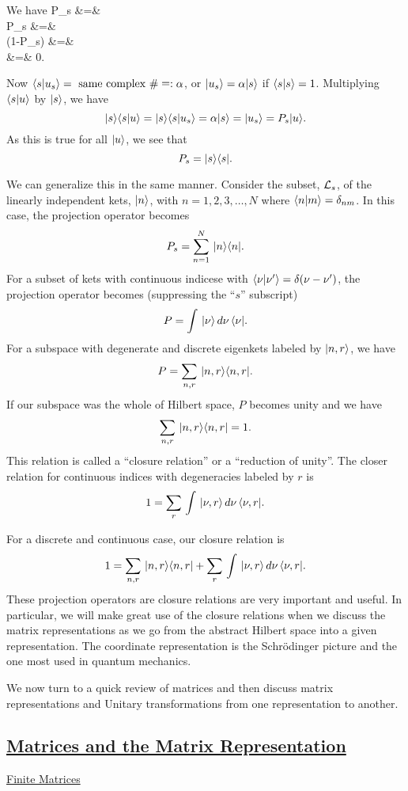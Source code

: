 We have 
\bearray
P_s  &=&  \\
P_s  &=&  \\
(1-P_s)  &=&  \\
  &=& 0.
\eearray

Now $\langle s|u_s\rangle = \mbox{ same complex } \#  \mathrel{\mathop=}: \alpha$, or $|u_s\rangle = \alpha|s\rangle$ if $\langle s|s\rangle = 1$. Multiplying $\langle s|u\rangle$ by $|s\rangle$, we have
$$|s\rangle\langle s|u\rangle = |s\rangle\langle s|u_s\rangle = \alpha |s\rangle = |u_s\rangle = P_s |u\rangle.$$
As this is true for all $|u\rangle$, we see that $$P_s = |s\rangle\langle s|.$$ 

We can generalize this in the same manner. Consider the subset, ${\cal L}_s$, of the linearly independent kets, $|n\rangle$, with $n = 1, 2, 3, \hdots, N$ where $\langle n|m\rangle = \delta_{nm}$. In this case, the projection operator becomes
$$P_s = \sum_{n=1}^N\, |n\rangle\langle n|.$$
For a subset of kets with continuous indicese with $\langle \nu|\nu'\rangle = \delta(\nu - \nu')$, the projection operator becomes (suppressing the ``$s$'' subscript)
$$P = \int\, |\nu\rangle\, d\nu\, \langle \nu|.$$
For a subspace with degenerate and discrete eigenkets labeled by $|n,r\rangle$, we have
$$P = \sum_{n,r}\, |n,r\rangle\langle n,r|.$$ If our subspace was the whole of Hilbert space, $P$ becomes unity and we have
$$\sum_{n,r}\, |n,r\rangle\langle n,r| = 1.$$ This relation is called a ``closure relation'' or a ``reduction of unity''. The closer relation for continuous indices with degeneracies labeled by $r$ is 
$$1 = \sum_r\,\int\, |\nu,r\rangle\, d\nu\, \langle \nu,r|.$$

For a discrete and continuous case, our closure relation is 
$$1 = \sum_{n,r}\, |n,r\rangle\langle n,r| + \sum_r\, \int\, |\nu,r\rangle\, d\nu\, \langle \nu,r|.$$
These projection operators are closure relations are very important and useful. In particular, we will make great use of the closure relations when we discuss the matrix representations as we go from the abstract Hilbert space
into a given representation. The coordinate representation is the Schr\"odinger picture and the one most used in quantum mechanics. 

We now turn to a quick review of matrices and then discuss matrix representations and Unitary transformations from one representation to another.

\subsection{\underline{Matrices and the Matrix Representation}}
\underline{Finite Matrices}

